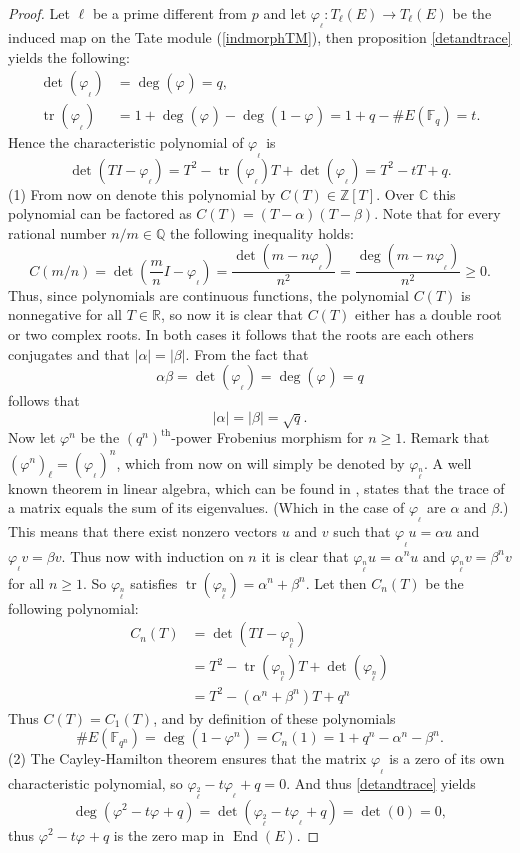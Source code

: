 \documentclass{article}
\numberwithin{equation}{section}
\theoremstyle{definition}
\newcommand{\CC}{{\mathbb C}} %
\newcommand{\QQ}{{\mathbb Q}} %
\newcommand{\ZZ}{{\mathbb Z}} %
\newcommand{\RR}{{\mathbb R}} %
\newcommand{\FF}[1]{{\mathbb F}_{#1}} %
\newcommand{\frob}[1][]{\varphi_{#1}} %
\newcommand{\degree}[1]{\operatorname{deg} \left(#1\right)} %
\newcommand{\detm}[1]{\operatorname{det} \left(#1\right)} %
\newcommand{\tr}[1]{\operatorname{tr} \left(#1\right)} %
\newcommand{\Endring}[1]{\operatorname{End} (#1)} %
\begin{document}
\begin{proof}
Let $\ell$ be a prime different from $p$ and let $\frob_\ell:T_\ell(E) \rightarrow T_\ell(E)$ be the induced map on the Tate module (\ref{indmorphTM}), then proposition \ref{detandtrace} yields the following: \begin{align*}
\detm{\frob_\ell} &= \degree{\frob}=q,\\
\tr{\frob_\ell} &= 1+\degree{\frob}-\degree{1-\frob}=1+q-\#E(\FF{q})=t.
\end{align*}
Hence the characteristic polynomial of $\frob_\ell$ is $$\detm{TI-\frob_\ell}=T^2-\tr{\frob_\ell}T+\detm{\frob_\ell}=T^2-tT+q.$$
(1) From now on denote this polynomial by $C(T)\in \ZZ[T]$. Over $\CC$ this polynomial can be factored as $C(T)=(T-\alpha)(T-\beta)$. Note that for every rational number $n/m \in \QQ$ the following inequality holds: $$C(m/n)=\detm{\frac{m}{n}I-\frob_\ell}=\frac{\detm{m-n\frob_\ell}}{n^2}=\frac{\degree{m-n\frob_\ell}}{n^2}\geq 0.$$ Thus, since polynomials are continuous functions, the polynomial $C(T)$ is nonnegative for all $T \in \RR$, so now it is clear that $C(T)$ either has a double root or two complex roots. In both cases it follows that the roots are each others conjugates and that $|\alpha|=|\beta|$. From the fact that$$\alpha\beta=\detm{\frob_\ell}=\degree{\frob}=q$$ follows that $$|\alpha|=|\beta|=\sqrt{q}.$$ Now let $\frob^n$ be the $(q^n)^\text{th}$-power Frobenius morphism for $n\geq 1$. Remark that $(\frob^n)_\ell=(\frob_\ell)^n$, which from now on will simply be denoted by $\frob_\ell^n$. A well known theorem in linear algebra, which can be found in \cite[7.1.1]{linalgebra}, states that the trace of a matrix equals the sum of its eigenvalues. (Which in the case of $\frob_\ell$ are $\alpha$ and $\beta$.) This means that there exist nonzero vectors $u$ and $v$ such that $\frob_\ell u = \alpha u$ and $\frob_\ell v = \beta v$. Thus now with induction on $n$ it is clear that $\frob_\ell^n u = \alpha^n u$ and $\frob_\ell^n v = \beta^n v$ for all $n \geq 1$. So $\frob_\ell^n$ satisfies $\tr{\frob_\ell^n} = \alpha^n+\beta^n$. Let then $C_n(T)$ be the following polynomial: \begin{align*}
C_n(T)&=\detm{TI-\frob_\ell^n}\\
&=T^2-\tr{\frob_\ell^n}T+\detm{\frob_\ell^n}\\
&=T^2 - (\alpha^n+\beta^n)T + q^n
\end{align*} 
Thus $C(T)=C_1(T)$, and by definition of these polynomials $$\#E(\FF{q^n})=\degree{1-\frob^n}=C_n(1)=1+q^n-\alpha^n -\beta^n.$$
(2) The Cayley-Hamilton theorem ensures that the matrix $\frob_\ell$ is a zero of its own characteristic polynomial, so $\frob_\ell^2-t\frob_\ell+q=0$. And thus \ref{detandtrace} yields $$\degree{\frob^2-t\frob+q}=\detm{\frob_\ell^2-t\frob_\ell+q}=\detm{0}=0,$$ thus $\frob^2-t\frob+q$ is the zero map in $\Endring{E}$.
\end{proof}
\end{document}
